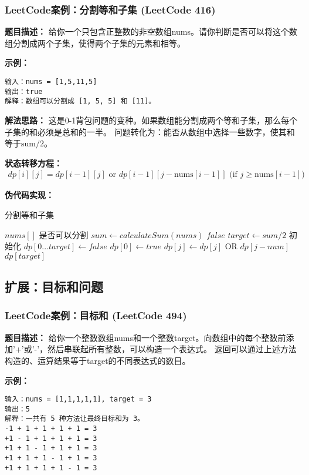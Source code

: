 \subsubsection{LeetCode案例：分割等和子集 (LeetCode 416)}
\textbf{题目描述：}
给你一个只包含正整数的非空数组nums。请你判断是否可以将这个数组分割成两个子集，使得两个子集的元素和相等。

\textbf{示例：}
\begin{verbatim}
输入：nums = [1,5,11,5]
输出：true
解释：数组可以分割成 [1, 5, 5] 和 [11]。
\end{verbatim}

\textbf{解法思路：}
这是0-1背包问题的变种。如果数组能分割成两个等和子集，那么每个子集的和必须是总和的一半。
问题转化为：能否从数组中选择一些数字，使其和等于$\text{sum}/2$。

\textbf{状态转移方程：}
\begin{align}
dp[i][j] = dp[i-1][j] \text{ or } dp[i-1][j-\text{nums}[i-1]] \text{ (if } j \geq \text{nums}[i-1]\text{)}
\end{align}

\textbf{伪代码实现：}
\begin{algorithm}
\caption{分割等和子集}
\begin{algorithmic}[1]
\REQUIRE $nums[]$
\ENSURE 是否可以分割
\STATE $sum \leftarrow calculateSum(nums)$
    \RETURN $false$
\ENDIF
\STATE $target \leftarrow sum / 2$
\STATE 初始化 $dp[0...target] \leftarrow false$
\STATE $dp[0] \leftarrow true$
        \STATE $dp[j] \leftarrow dp[j] \text{ OR } dp[j - num]$
    \ENDFOR
\ENDFOR
\RETURN $dp[target]$
\end{algorithmic}
\end{algorithm}

\subsection{扩展：目标和问题}
\subsubsection{LeetCode案例：目标和 (LeetCode 494)}
\textbf{题目描述：}
给你一个整数数组nums和一个整数target。向数组中的每个整数前添加'+'或'-'，然后串联起所有整数，可以构造一个表达式。
返回可以通过上述方法构造的、运算结果等于target的不同表达式的数目。

\textbf{示例：}
\begin{verbatim}
输入：nums = [1,1,1,1,1], target = 3
输出：5
解释：一共有 5 种方法让最终目标和为 3。
-1 + 1 + 1 + 1 + 1 = 3
+1 - 1 + 1 + 1 + 1 = 3
+1 + 1 - 1 + 1 + 1 = 3
+1 + 1 + 1 - 1 + 1 = 3
+1 + 1 + 1 + 1 - 1 = 3
\end{verbatim}

